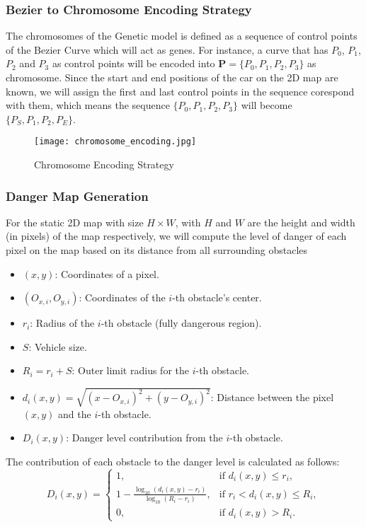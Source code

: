   \subsubsection{Bezier to Chromosome Encoding Strategy}
  The chromosomes of the Genetic model is defined as a sequence of control points of the Bezier Curve which will act as genes.
  For instance, a curve that has $P_0$, $P_1$, $P_2$ and $P_3$ as control points will be encoded into $\mathbf{P}=\{P_0, P_1, P_2, P_3\}$ as chromosome.
  Since the start and end positions of the car on the 2D map are known, we will assign the first and last control points in the sequence corespond with them, which means the sequence $\{P_0, P_1, P_2, P_3\}$ will become $\{P_S, P_1, P_2, P_E\}$.
  \begin{figure}[H]
    \centering
    \texttt{[image: chromosome\_encoding.jpg]}
    \caption{Chromosome Encoding Strategy}
  \end{figure}

  \subsubsection{Danger Map Generation}
  For the static 2D map with size $H\times W$, with $H$ and $W$ are the height and width (in pixels) of the map respectively, we will compute the level of danger of each pixel on the map based on its distance from all surrounding obstacles
  \begin{itemize}
    \item $ (x, y) $: Coordinates of a pixel.
    \item $ (O_{x,i}, O_{y,i}) $: Coordinates of the $ i $-th obstacle's center.
    \item $ r_i $: Radius of the $ i $-th obstacle (fully dangerous region).
    \item $ S $: Vehicle size.
    \item $ R_i = r_i + S $: Outer limit radius for the $ i $-th obstacle.
    \item $ d_i(x, y) = \sqrt{(x - O_{x,i})^2 + (y - O_{y,i})^2} $: Distance between the pixel $(x, y)$ and the $ i $-th obstacle.
    \item $ D_i(x, y) $: Danger level contribution from the $ i $-th obstacle.
  \end{itemize}
  The contribution of each obstacle to the danger level is calculated as follows:
  $$
    D_i(x, y) =
    \begin{cases} 
      1, & \text{if } d_i(x, y) \leq r_i, \\
      1 - \frac{\log_{10}(d_i(x, y) - r_i)}{\log_{10}(R_i - r_i)}, & \text{if } r_i < d_i(x, y) \leq R_i, \\
      0, & \text{if } d_i(x, y) > R_i.
    \end{cases}
  $$
    
